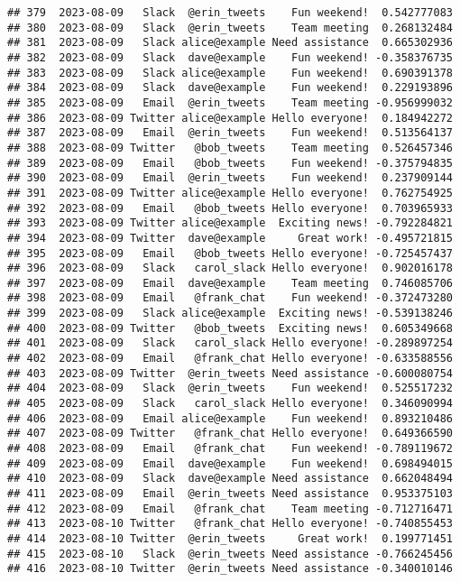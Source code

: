 \documentclass[
]{article}
\begin{document}
\begin{verbatim}
## 379  2023-08-09   Slack  @erin_tweets    Fun weekend!  0.542777083
## 380  2023-08-09   Slack  @erin_tweets    Team meeting  0.268132484
## 381  2023-08-09   Slack alice@example Need assistance  0.665302936
## 382  2023-08-09   Slack  dave@example    Fun weekend! -0.358376735
## 383  2023-08-09   Slack alice@example    Fun weekend!  0.690391378
## 384  2023-08-09   Slack  dave@example    Fun weekend!  0.229193896
## 385  2023-08-09   Email  @erin_tweets    Team meeting -0.956999032
## 386  2023-08-09 Twitter alice@example Hello everyone!  0.184942272
## 387  2023-08-09   Email  @erin_tweets    Fun weekend!  0.513564137
## 388  2023-08-09 Twitter   @bob_tweets    Team meeting  0.526457346
## 389  2023-08-09   Email   @bob_tweets    Fun weekend! -0.375794835
## 390  2023-08-09   Email  @erin_tweets    Fun weekend!  0.237909144
## 391  2023-08-09 Twitter alice@example Hello everyone!  0.762754925
## 392  2023-08-09   Email   @bob_tweets Hello everyone!  0.703965933
## 393  2023-08-09 Twitter alice@example  Exciting news! -0.792284821
## 394  2023-08-09 Twitter  dave@example     Great work! -0.495721815
## 395  2023-08-09   Email   @bob_tweets Hello everyone! -0.725457437
## 396  2023-08-09   Slack   carol_slack Hello everyone!  0.902016178
## 397  2023-08-09   Email  dave@example    Team meeting  0.746085706
## 398  2023-08-09   Email   @frank_chat    Fun weekend! -0.372473280
## 399  2023-08-09   Slack alice@example  Exciting news! -0.539138246
## 400  2023-08-09 Twitter   @bob_tweets  Exciting news!  0.605349668
## 401  2023-08-09   Slack   carol_slack Hello everyone! -0.289897254
## 402  2023-08-09   Email   @frank_chat Hello everyone! -0.633588556
## 403  2023-08-09 Twitter  @erin_tweets Need assistance -0.600080754
## 404  2023-08-09   Slack  @erin_tweets    Fun weekend!  0.525517232
## 405  2023-08-09   Slack   carol_slack Hello everyone!  0.346090994
## 406  2023-08-09   Email alice@example    Fun weekend!  0.893210486
## 407  2023-08-09 Twitter   @frank_chat Hello everyone!  0.649366590
## 408  2023-08-09   Email   @frank_chat    Fun weekend! -0.789119672
## 409  2023-08-09   Email  dave@example    Fun weekend!  0.698494015
## 410  2023-08-09   Slack  dave@example Need assistance  0.662048494
## 411  2023-08-09   Email  @erin_tweets Need assistance  0.953375103
## 412  2023-08-09   Email   @frank_chat    Team meeting -0.712716471
## 413  2023-08-10 Twitter   @frank_chat Hello everyone! -0.740855453
## 414  2023-08-10 Twitter  @erin_tweets     Great work!  0.199771451
## 415  2023-08-10   Slack  @erin_tweets Need assistance -0.766245456
## 416  2023-08-10 Twitter  @erin_tweets Need assistance -0.340010146

\end{verbatim}
\end{document}
